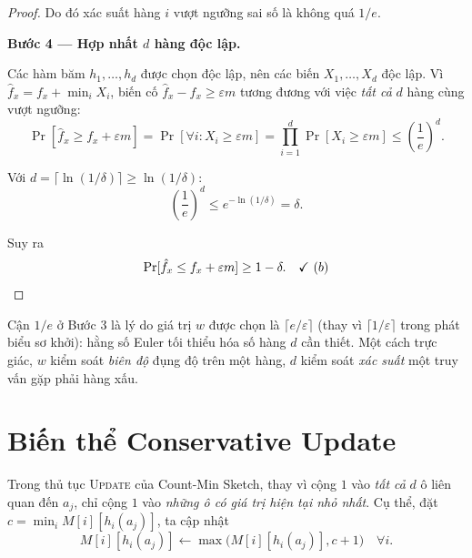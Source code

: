 \begin{proof}
Do đó xác suất hàng $i$ vượt ngưỡng sai số là không quá $1/e$.

\medskip\noindent\textbf{Bước 4 --- Hợp nhất $d$ hàng độc lập.}

Các hàm băm $h_1, \ldots, h_d$ được chọn độc lập, nên các biến $X_1, \ldots, X_d$ độc lập. Vì $\hat{f}_x = f_x + \min_i X_i$, biến cố $\hat{f}_x - f_x \ge \varepsilon m$ tương đương với việc \textit{tất cả} $d$ hàng cùng vượt ngưỡng:
\begin{equation}
\Pr[\hat{f}_x \ge f_x + \varepsilon m] = \Pr[\forall i: X_i \ge \varepsilon m] = \prod_{i=1}^{d} \Pr[X_i \ge \varepsilon m] \le \left(\frac{1}{e}\right)^d.
\label{eq:all-rows-fail}
\end{equation}

Với $d = \lceil \ln(1/\delta) \rceil \ge \ln(1/\delta)$:
\begin{equation}
\left(\frac{1}{e}\right)^d \le e^{-\ln(1/\delta)} = \delta.
\label{eq:delta-bound}
\end{equation}

Suy ra
\begin{equation}
\Pr[\hat{f}_x \le f_x + \varepsilon m] \ge 1 - \delta. \quad\checkmark~(b) \qedhere
\label{eq:cms-final-guarantee}
\end{equation}
\end{proof}

Cận $1/e$ ở Bước 3 là lý do giá trị $w$ được chọn là $\lceil e/\varepsilon \rceil$ (thay vì $\lceil 1/\varepsilon \rceil$ trong phát biểu sơ khởi): hằng số Euler tối thiểu hóa số hàng $d$ cần thiết. Một cách trực giác, $w$ kiểm soát \textit{biên độ} đụng độ trên một hàng, $d$ kiểm soát \textit{xác suất} một truy vấn gặp phải hàng xấu.

\section{Biến thể Conservative Update}

\begin{definition}
\label{def:cu}
Trong thủ tục \textsc{Update} của Count-Min Sketch, thay vì cộng $1$ vào \textit{tất cả} $d$ ô liên quan đến $a_j$, chỉ cộng $1$ vào \textit{những ô có giá trị hiện tại nhỏ nhất}. Cụ thể, đặt $c = \min_i M[i][h_i(a_j)]$, ta cập nhật
\begin{equation}
M[i][h_i(a_j)] \gets \max\bigl(M[i][h_i(a_j)], c + 1\bigr) \quad \forall i.
\label{eq:conservative-update}
\end{equation}
\end{definition}

